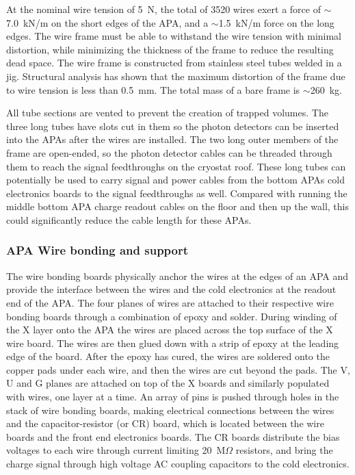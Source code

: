 At the nominal wire tension of 5~N, the total of 3520 wires exert a
force of $\sim$7.0~kN/m on the short edges of the APA, and a
$\sim$1.5~kN/m force on the long edges. The wire frame must be able to
withstand the wire tension with minimal distortion, while minimizing
the thickness of the frame to reduce the resulting dead space. The
wire frame is constructed from stainless steel tubes welded in a
jig.  Structural analysis has shown that the maximum distortion of the
frame due to wire tension is less than 0.5~mm. The total mass of a
bare frame is $\sim$260~kg.


All tube sections are vented to prevent the creation of trapped
volumes. The three long tubes have slots cut in them so the photon
detectors can be inserted into the APAs after the wires are installed.
The two long outer members of the frame are open-ended, so the photon
detector cables can be threaded through them to reach the signal
feedthroughs on the cryostat roof.  These long tubes can potentially
be used to carry signal and power cables from the bottom APAs cold
electronics boards to the signal feedthroughs as well.  Compared with
running the middle bottom APA charge readout cables on the floor and
then up the wall, this could significantly reduce the cable length for
these APAs.


\subsubsection{APA Wire bonding and support}
\label{subsec:fd-ref-wirewrap}


The wire bonding boards physically anchor the wires at the edges of an
APA and provide the interface between the wires and the cold
electronics at the readout end of the APA.  The four planes of wires
are attached to their respective wire bonding boards through a
combination of epoxy and solder. During winding of the X layer onto
the APA the wires are placed across the top surface of the X wire
board. The wires are then glued down with a strip of epoxy at the
leading edge of the board.  After the epoxy has cured, the wires are
soldered onto the copper pads under each wire, and then the wires are
cut beyond the pads. The V, U and G planes are attached on top of the
X boards and similarly populated with wires, one layer at a time. An
array of pins is pushed through holes in the stack of wire bonding
boards, making electrical connections between the wires and the
capacitor-resistor (or CR) board, which is located between the wire
boards and the front end electronics boards.  The CR boards distribute
the bias voltages to each wire through current limiting 20~M$\Omega$
resistors, and bring the charge signal through high voltage AC
coupling capacitors to the cold electronics.

